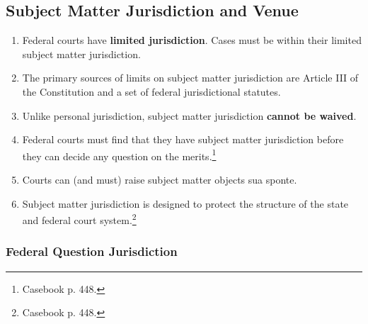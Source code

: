\subsection{Subject Matter Jurisdiction and Venue}

\begin{enumerate}
    \item Federal courts have \textbf{limited jurisdiction}. Cases must be within their limited subject matter jurisdiction.
    \item The primary sources of limits on subject matter jurisdiction are Article III of the Constitution and a set of federal jurisdictional statutes.
    \item Unlike personal jurisdiction, subject matter jurisdiction \textbf{cannot be waived}.
    \item Federal courts must find that they have subject matter jurisdiction before they can decide any question on the merits.\footnote{Casebook p. 448.}
    \item Courts can (and must) raise subject matter objects sua sponte.
    \item Subject matter jurisdiction is designed to protect the structure of the state and federal court system.\footnote{Casebook p. 448.}
\end{enumerate}

\subsubsection{Federal Question Jurisdiction}

